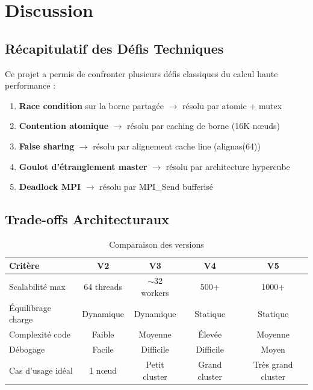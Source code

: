 \documentclass[12pt,a4paper,twoside]{report}
\begin{document}

\chapter{Discussion}

\section{Récapitulatif des Défis Techniques}

Ce projet a permis de confronter plusieurs défis classiques du calcul haute performance :

\begin{enumerate}
    \item \textbf{Race condition} sur la borne partagée $\rightarrow$ résolu par atomic + mutex
    \item \textbf{Contention atomique} $\rightarrow$ résolu par caching de borne (16K nœuds)
    \item \textbf{False sharing} $\rightarrow$ résolu par alignement cache line (alignas(64))
    \item \textbf{Goulot d'étranglement master} $\rightarrow$ résolu par architecture hypercube
    \item \textbf{Deadlock MPI} $\rightarrow$ résolu par MPI\_Send bufferisé
\end{enumerate}

\section{Trade-offs Architecturaux}

\begin{table}[htbp]
\centering
\caption{Comparaison des versions}
\label{tab:version-comparison}
\begin{tabular}{@{}lcccc@{}}
\toprule
\textbf{Critère} & \textbf{V2} & \textbf{V3} & \textbf{V4} & \textbf{V5} \\
\midrule
Scalabilité max & 64 threads & $\sim$32 workers & 500+ & 1000+ \\
Équilibrage charge & Dynamique & Dynamique & Statique & Statique \\
Complexité code & Faible & Moyenne & Élevée & Moyenne \\
Débogage & Facile & Difficile & Difficile & Moyen \\
Cas d'usage idéal & 1 nœud & Petit cluster & Grand cluster & Très grand cluster \\
\bottomrule
\end{tabular}
\end{table}
\end{document}
